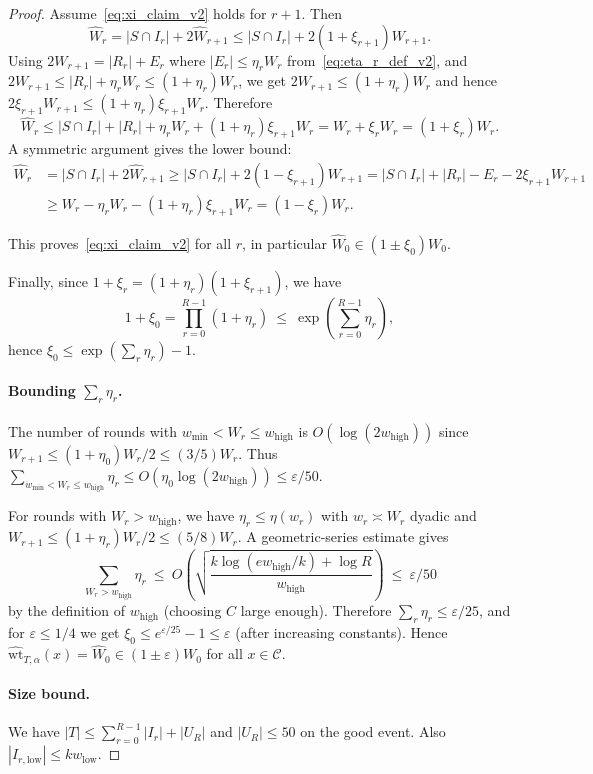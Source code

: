 \documentclass{article}
\DeclareMathOperator{\high}{\mathrm{high}}
\DeclareMathOperator{\low}{\mathrm{low}}
\newcommand{\<}{\langle}
\renewcommand{\>}{\rangle}
\newcommand{\calC}{\mathcal{C}}
\begin{document}
\begin{proof}
{Assume~\eqref{eq:xi_claim_v2} holds for $r+1$. Then
\[
\widehat W_r
=
|S\cap I_r|+2\widehat W_{r+1}
\le
|S\cap I_r|+2(1+\xi_{r+1})W_{r+1}.
\]
Using $2W_{r+1}=|R_r|+E_r$ where $|E_r|\le \eta_r W_r$ from~\eqref{eq:eta_r_def_v2}, and
$2W_{r+1}\le |R_r|+\eta_r W_r\le (1+\eta_r)W_r$, we get $2W_{r+1}\le (1+\eta_r)W_r$ and hence
$2\xi_{r+1}W_{r+1}\le (1+\eta_r)\xi_{r+1}W_r$.
Therefore
\[
\widehat W_r
\le
|S\cap I_r|+|R_r|+\eta_r W_r+(1+\eta_r)\xi_{r+1}W_r
=
W_r+\xi_r W_r
=
(1+\xi_r)W_r.
\]
A symmetric argument gives the lower bound:
\begin{align*}
\widehat W_r
&   =
|S\cap I_r|+2\widehat W_{r+1}
\ge
|S\cap I_r|+2(1-\xi_{r+1})W_{r+1}
=
|S\cap I_r|+|R_r|-E_r-2\xi_{r+1}W_{r+1}
\\
& \ge
W_r-\eta_r W_r-(1+\eta_r)\xi_{r+1}W_r
=
(1-\xi_r)W_r.
\end{align*}
    

This proves~\eqref{eq:xi_claim_v2} for all $r$, in particular
$\widehat W_0\in(1\pm \xi_0)W_0$.

Finally, since $1+\xi_r=(1+\eta_r)(1+\xi_{r+1})$, we have
\[
1+\xi_0=\prod_{r=0}^{R-1}(1+\eta_r)\ \le\ \exp\!\left(\sum_{r=0}^{R-1}\eta_r\right),
\]
hence $\xi_0\le \exp(\sum_r\eta_r)-1$.

\paragraph{Bounding $\sum_r\eta_r$.}
The number of rounds with $w_{\min}<W_r\le w_{\high}$ is $O(\log(2w_{\high}))$ since
$W_{r+1}\le (1+\eta_0)W_r/2\le (3/5)W_r$.
Thus $\sum_{w_{\min}<W_r\le w_{\high}}\eta_r\le O(\eta_0\log(2w_{\high}))\le \varepsilon/50$.

For rounds with $W_r>w_{\high}$, we have $\eta_r\le \eta(w_r)$ with $w_r\asymp W_r$ dyadic and
$W_{r+1}\le (1+\eta_r)W_r/2\le (5/8)W_r$. A geometric-series estimate gives
\[
\sum_{W_r>w_{\high}}\eta_r
\ \le\
O\!\left(\sqrt{\frac{k\log(e w_{\high}/k)+\log R}{w_{\high}}}\right)
\ \le\ \varepsilon/50
\]
by the definition of $w_{\high}$ (choosing $C$ large enough).
Therefore $\sum_r\eta_r\le \varepsilon/25$, and for $\varepsilon\le 1/4$ we get
$\xi_0\le e^{\varepsilon/25}-1\le \varepsilon$ (after increasing constants).
Hence $\widehat{\mathrm{wt}}_{T,\alpha}(x)=\widehat W_0\in (1\pm\varepsilon)W_0$ for all $x\in\calC$.}

\paragraph{Size bound.}
We have $|T|\le \sum_{r=0}^{R-1}|I_r|+|U_R|$ and $|U_R|\le 50$ on the good event.
Also $|I_{r,\mathrm{low}}|\le k w_{\low}$.


\end{proof}
\end{document}
